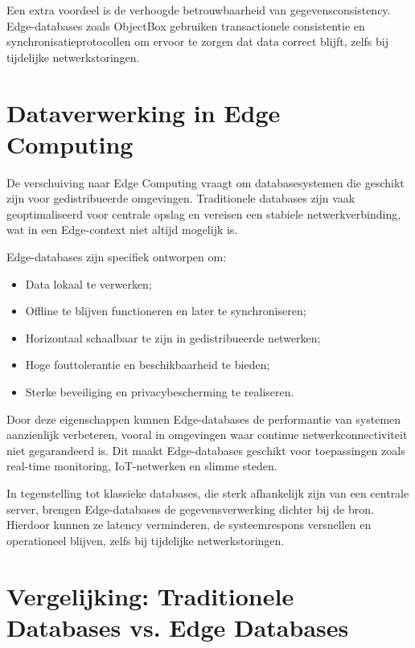 Een extra voordeel is de verhoogde betrouwbaarheid van gegevensconsistency. Edge-databases zoals ObjectBox gebruiken transactionele consistentie en synchronisatieprotocollen om ervoor te zorgen dat data correct blijft, zelfs bij tijdelijke netwerkstoringen\autocite{Rahmani2018, Taheri2020}.

\section{Dataverwerking in Edge Computing}
\label{sec:dataverwerking-edge}

De verschuiving naar Edge Computing vraagt om databasesystemen die geschikt zijn voor gedistribueerde omgevingen. Traditionele databases zijn vaak geoptimaliseerd voor centrale opslag en vereisen een stabiele netwerkverbinding, wat in een Edge-context niet altijd mogelijk is\autocite{Kleppmann2017}.

Edge-databases zijn specifiek ontworpen om:

\begin{itemize}
    \item Data lokaal te verwerken;
    \item Offline te blijven functioneren en later te synchroniseren;
    \item Horizontaal schaalbaar te zijn in gedistribueerde netwerken;
    \item Hoge fouttolerantie en beschikbaarheid te bieden;
    \item Sterke beveiliging en privacybescherming te realiseren.
\end{itemize}

Door deze eigenschappen kunnen Edge-databases de performantie van systemen aanzienlijk verbeteren, vooral in omgevingen waar continue netwerkconnectiviteit niet gegarandeerd is. Dit maakt Edge-databases geschikt voor toepassingen zoals real-time monitoring, IoT-netwerken en slimme steden.

In tegenstelling tot klassieke databases, die sterk afhankelijk zijn van een centrale server, brengen Edge-databases de gegevensverwerking dichter bij de bron. Hierdoor kunnen ze latency verminderen, de systeemrespons versnellen en operationeel blijven, zelfs bij tijdelijke netwerkstoringen\autocite{Rahmani2018, Taheri2020}.

\section{Vergelijking: Traditionele Databases vs. Edge Databases}
\label{sec:vergelijking-databases}

